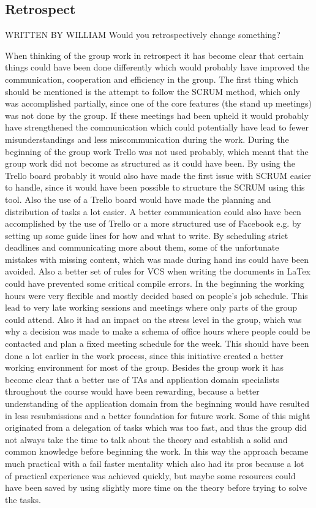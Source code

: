 \subsection{Retrospect}
WRITTEN BY WILLIAM 
Would you retrospectively change something?

When thinking of the group work in retrospect it has become clear that certain things could have been done differently which would probably have improved the communication, cooperation and efficiency in the group.
The first thing which should be mentioned is the attempt to follow the SCRUM method, which only was accomplished partially, since one of the core features (the stand up meetings) was not done by the group. If these meetings had been upheld it would probably have strengthened the communication which could potentially have lead to fewer misunderstandings and less miscommunication during the work.
During the beginning of the group work Trello was not used probably, which meant that the group work did not become as structured as it could have been. By using the Trello board probably it would also have made the first issue with SCRUM easier to handle, since it would have been possible to structure the SCRUM using this tool. Also the use of a Trello board would have made the planning and distribution of tasks a lot easier.
A better communication could also have been accomplished by the use of Trello or a more structured use of Facebook e.g. by setting up some guide lines for how and what to write. By scheduling strict deadlines and communicating more about them, some of the unfortunate mistakes with missing content, which was made during hand ins could have been avoided. Also a better set of rules for VCS when writing the documents in LaTex could have prevented some critical compile errors.
In the beginning the working hours were very flexible and mostly decided based on people's job schedule. This lead to very late working sessions and meetings where only parts of the group could attend. Also it had an impact on the stress level in the group, which was why a decision was made to make a schema of office hours where people could be contacted and plan a fixed meeting schedule for the week. This should have been done a lot earlier in the work process, since this initiative created a better working environment for most of the group.
Besides the group work it has become clear that a better use of TAs and application domain specialists throughout the course would have been rewarding, because a better understanding of the application domain from the beginning would have resulted in less resubmissions and a better foundation for future work. Some of this might originated from a delegation of tasks which was too fast, and thus the group did not always take the time to talk about the theory and establish a solid and common knowledge before beginning the work. In this way the approach became much practical with a fail faster mentality which also had its pros because a lot of practical experience was achieved quickly, but maybe some resources could have been saved by using slightly more time on the theory before trying to solve the tasks.

